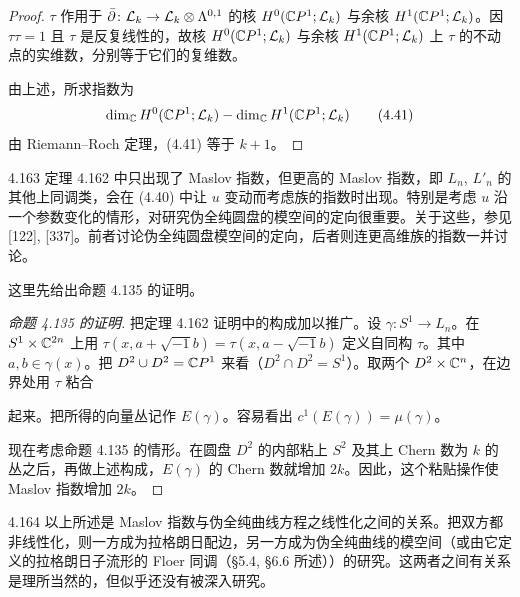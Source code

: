 \begin{proof}
  $\tau$ 作用于 $\bar\partial\colon\mathcal{L}_k\to\mathcal{L}_k\otimes\Lambda^{0,1}$ 的核 $H^0(\mathbb{C}P^1;\mathcal{L}_k)$ 与余核 $H^1(\mathbb{C}P^1;\mathcal{L}_k)$。因 $\tau\tau=1$ 且 $\tau$ 是反复线性的，故核 $H^0(\mathbb{C}P^1;\mathcal{L}_k)$ 与余核 $H^1(\mathbb{C}P^1;\mathcal{L}_k)$ 上 $\tau$ 的不动点的实维数，分别等于它们的复维数。

  由上述，所求指数为
  \begin{equation}
    \dim_{\mathbb{C}}H^0(\mathbb{C}P^1;\mathcal{L}_k)-\dim_{\mathbb{C}}H^1(\mathbb{C}P^1;\mathcal{L}_k) \tag{4.41}
  \end{equation}
  由 Riemann--Roch 定理，(4.41) 等于 $k+1$。
\end{proof}

\begin{remark}{4.163}
  定理 4.162 中只出现了 Maslov 指数，但更高的 Maslov 指数，即 $L_n$, $L'_n$ 的其他上同调类，会在 (4.40) 中让 $u$ 变动而考虑族的指数时出现。特别是考虑 $u$ 沿一个参数变化的情形，对研究伪全纯圆盘的模空间的定向很重要。关于这些，参见 [122], [337]。前者讨论伪全纯圆盘模空间的定向，后者则连更高维族的指数一并讨论。
\end{remark}


这里先给出命题 4.135 的证明。

\begin{proof}[命题 4.135 的证明]
  把定理 4.162 证明中的构成加以推广。设 $\gamma\colon S^1\to L_n$。在 $S^1\times\mathbb{C}^{2n}$ 上用 $\tau(x,a+\sqrt{-1}b)=\tau(x,a-\sqrt{-1}b)$ 定义自同构 $\tau$。其中 $a,b\in\gamma(x)$。把 $D^2\cup D^2=\mathbb{C}P^1$ 来看（$D^2\cap D^2=S^1$）。取两个 $D^2\times\mathbb{C}^n$，在边界处用 $\tau$ 粘合

  起来。把所得的向量丛记作 $E(\gamma)$。容易看出 $c^1(E(\gamma))=\mu(\gamma)$。

  现在考虑命题 4.135 的情形。在圆盘 $D^2$ 的内部粘上 $S^2$ 及其上 Chern 数为 $k$ 的丛之后，再做上述构成，$E(\gamma)$ 的 Chern 数就增加 $2k$。因此，这个粘贴操作使 Maslov 指数增加 $2k$。
\end{proof}

\begin{remark}{4.164}
  以上所述是 Maslov 指数与伪全纯曲线方程之线性化之间的关系。把双方都非线性化，则一方成为拉格朗日配边，另一方成为伪全纯曲线的模空间（或由它定义的拉格朗日子流形的 Floer 同调（§5.4, §6.6 所述））的研究。这两者之间有关系是理所当然的，但似乎还没有被深入研究。
\end{remark}

